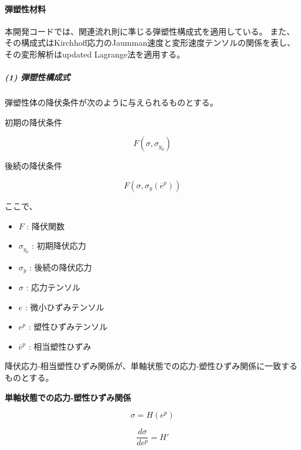 \documentclass[a4paper,pandoc,ja=standard]{bxjsarticle}
\providecommand{\tightlist}{%
  \setlength{\itemsep}{0pt}\setlength{\parskip}{0pt}}
\let\oldparagraph\paragraph
\renewcommand{\paragraph}[1]{\oldparagraph{#1}\mbox{}}
\let\oldsubparagraph\subparagraph
\renewcommand{\subparagraph}[1]{\oldsubparagraph{#1}\mbox{}}
\begin{document}
\hypertarget{ux5f3eux5851ux6027ux6750ux6599}{%
\paragraph{弾塑性材料}\label{ux5f3eux5851ux6027ux6750ux6599}}

本開発コードでは、関連流れ則に準じる弾塑性構成式を適用している。
また、その構成式はKirchhoff応力のJaumman速度と変形速度テンソルの関係を表し、その変形解析はupdated Lagrange法を適用する。

\hypertarget{ux5f3eux5851ux6027ux69cbux6210ux5f0f}{%
\subparagraph{(1) 弾塑性構成式}\label{ux5f3eux5851ux6027ux69cbux6210ux5f0f}}

弾塑性体の降伏条件が次のように与えられるものとする。

初期の降伏条件

\begin{equation}
F( \sigma, \sigma_{y_0})
\label{eq:2.2.39}
\end{equation}

後続の降伏条件

\begin{equation}
F(\sigma, \sigma_y (\overline{e}^p))
\label{eq:2.2.40}
\end{equation}

ここで、

\begin{itemize}
\tightlist
\item
  \(F\) : 降伏関数
\item
  \(\sigma_{y_0}\) : 初期降伏応力
\item
  \(\sigma_y\) : 後続の降伏応力
\item
  \(\sigma\) : 応力テンソル
\item
  \(e\) : 微小ひずみテンソル
\item
  \(e^p\) : 塑性ひずみテンソル
\item
  \(\overline{e}^p\) : 相当塑性ひずみ
\end{itemize}

降伏応力-相当塑性ひずみ関係が、単軸状態での応力-塑性ひずみ関係に一致するものとする。

\textbf{単軸状態での応力-塑性ひずみ関係}

\begin{equation}
\sigma = H(e^p)
\label{eq:2.2.41}
\end{equation}

\begin{equation}
\frac{d \sigma}{d e^p} = H'
\label{eq:2.2.42}
\end{equation}
\end{document}
